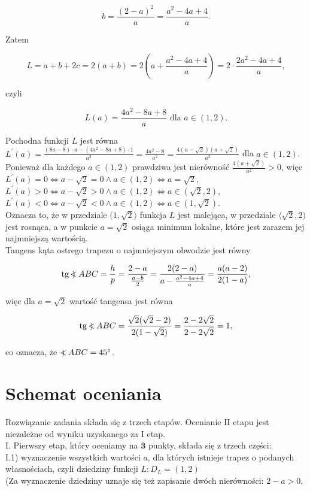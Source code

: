 \documentclass[10pt]{article}
\newcommand\Varangle{\mathop{{<\!\!\!\!\!\text{\small)}}\:}\nolimits}
\begin{document}
$$
b=\frac{(2-a)^{2}}{a}=\frac{a^{2}-4 a+4}{a} .
$$

Zatem

$$
L=a+b+2 c=2(a+b)=2\left(a+\frac{a^{2}-4 a+4}{a}\right)=2 \cdot \frac{2 a^{2}-4 a+4}{a},
$$

czyli

$$
L(a)=\frac{4 a^{2}-8 a+8}{a} \text { dla } a \in(1,2) .
$$

Pochodna funkcji $L$ jest równa\\
$L^{\prime}(a)=\frac{(8 a-8) \cdot a-\left(4 a^{2}-8 a+8\right) \cdot 1}{a^{2}}=\frac{4 a^{2}-8}{a^{2}}=\frac{4(a-\sqrt{2})(a+\sqrt{2})}{a^{2}}$ dla $a \in(1,2)$.\\
Ponieważ dla każdego $a \in(1,2)$ prawdziwa jest nierówność $\frac{4(a+\sqrt{2})}{a^{2}}>0$, więc\\
$L^{\prime}(a)=0 \Leftrightarrow a-\sqrt{2}=0 \wedge a \in(1,2) \Leftrightarrow a=\sqrt{2}$,\\
$L^{\prime}(a)>0 \Leftrightarrow a-\sqrt{2}>0 \wedge a \in(1,2) \Leftrightarrow a \in(\sqrt{2}, 2)$,\\
$L^{\prime}(a)<0 \Leftrightarrow a-\sqrt{2}<0 \wedge a \in(1,2) \Leftrightarrow a \in(1, \sqrt{2})$.\\
Oznacza to, że w przedziale $(1, \sqrt{2}\rangle$ funkcja $L$ jest malejąca, w przedziale $\langle\sqrt{2}, 2)$ jest rosnąca, a w punkcie $a=\sqrt{2}$ osiąga minimum lokalne, które jest zarazem jej najmniejszą wartością.\\
Tangens kąta ostrego trapezu o najmniejszym obwodzie jest równy

$$
\operatorname{tg} \Varangle A B C=\frac{h}{p}=\frac{2-a}{\frac{a-b}{2}}=\frac{2(2-a)}{a-\frac{a^{2}-4 a+4}{a}}=\frac{a(a-2)}{2(1-a)},
$$

więc dla $a=\sqrt{2}$ wartość tangensa jest równa

$$
\operatorname{tg} \Varangle A B C=\frac{\sqrt{2}(\sqrt{2}-2)}{2(1-\sqrt{2})}=\frac{2-2 \sqrt{2}}{2-2 \sqrt{2}}=1,
$$

co oznacza, że $\Varangle A B C=45^{\circ}$.

\section*{Schemat oceniania}
Rozwiązanie zadania składa się z trzech etapów. Ocenianie II etapu jest niezależne od wyniku uzyskanego za I etap.\\
I. Pierwszy etap, który oceniamy na $\mathbf{3}$ punkty, składa się z trzech części:\\
I.1) wyznaczenie wszystkich wartości $a$, dla których istnieje trapez o podanych własnościach, czyli dziedziny funkcji $L: D_{L}=(1,2)$\\
(Za wyznaczenie dziedziny uznaje się też zapisanie dwóch nierówności: $2-a>0$,
\end{document}
